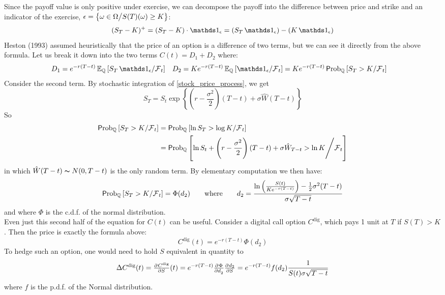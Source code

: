 \documentclass[11pt]{article}
\begin{document}
Since the payoff value is only positive under exercise, we can decompose the payoff into the difference between price and strike and an indicator of the exercise, $\epsilon = \left\{ \omega \in \Omega \middle/ S(T)(\omega) \geq K\right\}$:
$$ (S_T-K)^+ = (S_T-K) \cdot \Ind_{\epsilon} = (S_T \Ind_{\epsilon}) - (K \Ind_{\epsilon})$$
Heston (1993) assumed heuristically that the price of an option is a difference of two terms, but we can see it directly from the above formula. Let us break it down into the two terms $C(t) = D_1 + D_2$ where:
\begin{align*}
D_1 &= e^{-r(T-t)}\Exp_{\Qmeas}\left[ S_T \Ind_{\epsilon} \middle/ \Filtr_t \right] & D_2 &= K e^{-r(T-t)}\Exp_{\Qmeas}\left[ \Ind_{\epsilon} \middle/ \Filtr_t \right] = K e^{-r(T-t)}\Prob_{\Qmeas}\left[ S_T > K \middle/ \Filtr_t \right]
\end{align*}
Consider the second term. By stochastic integration of \eqref{stock_price_process}, we get
$$ S_T = S_t \exp \left\{ \left( r - \frac{\sigma^2}{2}\right)(T-t) + \sigma \hat{W}(T-t)\right\}$$
So
\begin{align*}
\operatorname{\mathsf Prob}_{\operatorname{\mathbb Q}}\left[ S_T > K \middle/ \operatorname{\mathcal F}_t \right] 
&= \operatorname{\mathsf Prob}_{\operatorname{\mathbb Q}}\left[ \ln S_T > \log K \middle/ \operatorname{\mathcal F}_t \right] \\
&= \operatorname{\mathsf Prob}_{\operatorname{\mathbb Q}}\left[ \ln S_t + \left( r - \frac{\sigma^2}{2}\right)(T-t) + \sigma \hat{W}_{T-t} > \ln K \middle/ \operatorname{\mathcal F}_t \right] \\
\end{align*}
in which $\hat{W}(T-t) \thicksim N(0, T-t)$ is the only random term. By elementary computation we then have:
$$\operatorname{\mathsf Prob}_{\operatorname{\mathbb Q}}\left[ S_T > K \middle/ \operatorname{\mathcal F}_t \right] = \Phi(d_2) \qquad \text{where} \qquad d_2 = \frac{\ln \left( \frac{S(t)}{Ke^{-r(T-t)}}\right) - \frac{1}{2}\sigma^2(T-t)}{\sigma \sqrt{T-t}}$$ 
and where $\Phi$ is the c.d.f. of the normal distribution. \\

Even just this second half of the equation for $C(t)$ can be useful. Consider a digital call option $C^{\text{dig}}$, which pays 1 unit at $T$ if $S(T) > K$. Then the price is exactly the formula above:
$$C^{\text{dig}}(t) = e^{-r(T-t)} \Phi(d_2)$$
To hedge such an option, one would need to hold $S$ equivalent in quantity to 
$$\Delta C^{\text{dig}}(t) = \pd{C^{\text{dig}}}{S}(t) =  e^{-r(T-t)} \pd{\Phi}{d_2} \pd{d_2}{S} = e^{-r(T-t)} f(d_2) \frac{1}{S(t) \sigma \sqrt{T-t}}$$
where $f$ is the p.d.f. of the Normal distribution. \\
\end{document}

